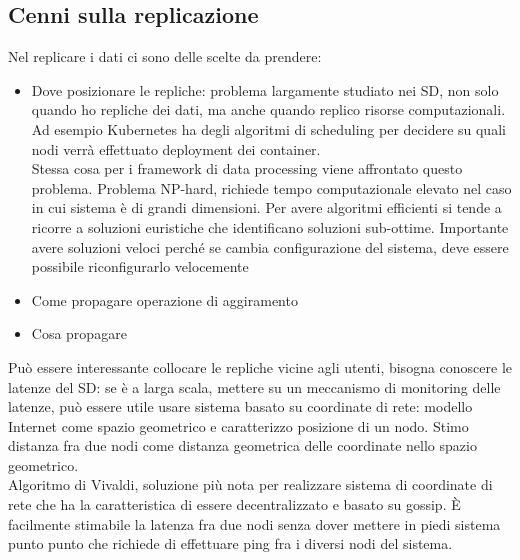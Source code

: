 \documentclass[16px]{article}
\begin{document}
\subsection{Cenni sulla replicazione}
Nel replicare i dati ci sono delle scelte da prendere:
\begin{itemize}
\item Dove posizionare le repliche: problema largamente studiato nei SD, non solo quando ho repliche dei dati, ma anche quando replico risorse computazionali.\\ Ad esempio Kubernetes ha degli algoritmi di scheduling per decidere su quali nodi verrà effettuato deployment dei container. \\ Stessa cosa per i framework di data processing viene affrontato questo problema. Problema NP-hard, richiede tempo computazionale elevato nel caso in cui sistema è di grandi dimensioni. Per avere algoritmi efficienti si tende a ricorre a soluzioni euristiche che identificano soluzioni sub-ottime. Importante avere soluzioni veloci perché se cambia configurazione del sistema, deve essere possibile riconfigurarlo velocemente
\item Come propagare operazione di aggiramento
\item Cosa propagare
\end{itemize} 
Può essere interessante collocare le repliche vicine agli utenti, bisogna conoscere le latenze del SD: se è a larga scala, mettere su un meccanismo di monitoring delle latenze, può essere utile usare sistema basato su coordinate di rete: modello Internet come spazio geometrico e caratterizzo posizione di un nodo. Stimo distanza fra due nodi come distanza geometrica delle coordinate nello spazio geometrico.\\ Algoritmo di Vivaldi, soluzione più nota per realizzare sistema di coordinate di rete che ha la caratteristica di essere decentralizzato e basato su gossip. È facilmente stimabile la latenza fra due nodi senza dover mettere in piedi sistema punto punto che richiede di effettuare ping fra i diversi nodi del sistema.
\end{document}
